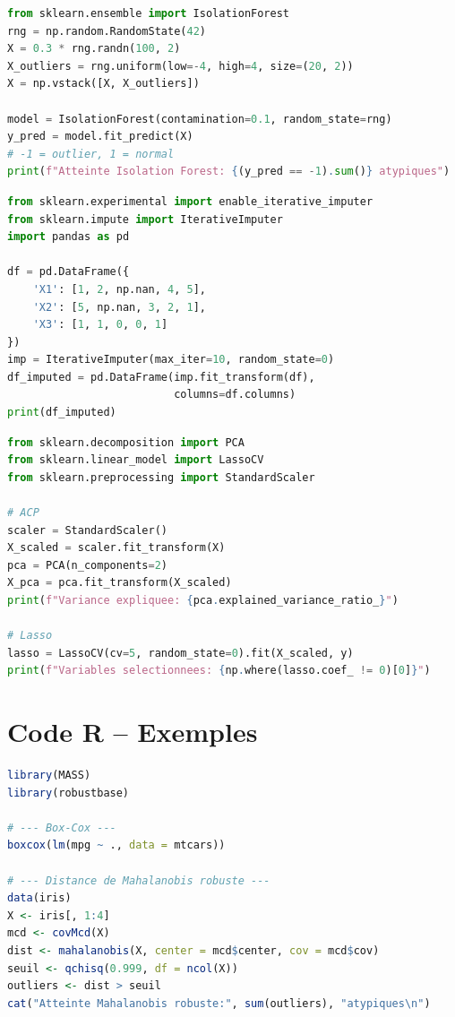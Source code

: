 \documentclass[a4paper,11pt]{article}
\theoremstyle{definition}
\theoremstyle{remark}
\begin{document}
\begin{lstlisting}[language=Python, caption=Isolation Forest]
from sklearn.ensemble import IsolationForest
rng = np.random.RandomState(42)
X = 0.3 * rng.randn(100, 2)
X_outliers = rng.uniform(low=-4, high=4, size=(20, 2))
X = np.vstack([X, X_outliers])

model = IsolationForest(contamination=0.1, random_state=rng)
y_pred = model.fit_predict(X)
# -1 = outlier, 1 = normal
print(f"Atteinte Isolation Forest: {(y_pred == -1).sum()} atypiques")
\end{lstlisting}

\begin{lstlisting}[language=Python, caption=Imputation multiple avec IterativeImputer]
from sklearn.experimental import enable_iterative_imputer
from sklearn.impute import IterativeImputer
import pandas as pd

df = pd.DataFrame({
    'X1': [1, 2, np.nan, 4, 5],
    'X2': [5, np.nan, 3, 2, 1],
    'X3': [1, 1, 0, 0, 1]
})
imp = IterativeImputer(max_iter=10, random_state=0)
df_imputed = pd.DataFrame(imp.fit_transform(df),
                          columns=df.columns)
print(df_imputed)
\end{lstlisting}

\begin{lstlisting}[language=Python, caption=ACP et Lasso]
from sklearn.decomposition import PCA
from sklearn.linear_model import LassoCV
from sklearn.preprocessing import StandardScaler

# ACP
scaler = StandardScaler()
X_scaled = scaler.fit_transform(X)
pca = PCA(n_components=2)
X_pca = pca.fit_transform(X_scaled)
print(f"Variance expliquee: {pca.explained_variance_ratio_}")

# Lasso
lasso = LassoCV(cv=5, random_state=0).fit(X_scaled, y)
print(f"Variables selectionnees: {np.where(lasso.coef_ != 0)[0]}")
\end{lstlisting}

\section{Code R -- Exemples}

\begin{lstlisting}[language=R, caption=Box-Cox et Mahalanobis]
library(MASS)
library(robustbase)

# --- Box-Cox ---
boxcox(lm(mpg ~ ., data = mtcars))

# --- Distance de Mahalanobis robuste ---
data(iris)
X <- iris[, 1:4]
mcd <- covMcd(X)
dist <- mahalanobis(X, center = mcd$center, cov = mcd$cov)
seuil <- qchisq(0.999, df = ncol(X))
outliers <- dist > seuil
cat("Atteinte Mahalanobis robuste:", sum(outliers), "atypiques\n")
\end{lstlisting}
\end{document}
